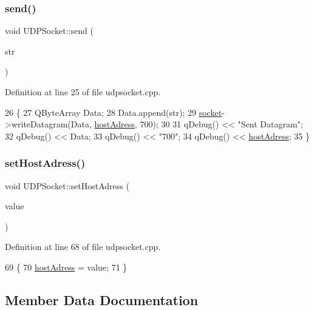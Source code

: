\subsubsection{\texorpdfstring{send()}{send()}}
{\footnotesize\ttfamily void U\+D\+P\+Socket\+::send (\begin{DoxyParamCaption}\item[{Q\+String}]{str }\end{DoxyParamCaption})}



Definition at line 25 of file udpsocket.\+cpp.


\begin{DoxyCode}
26 \{
27     QByteArray Data;
28     Data.append(str);
29     \hyperlink{class_u_d_p_socket_a9d27cb09deee765dfec056cfc774c878}{socket}->writeDatagram(Data, \hyperlink{class_u_d_p_socket_aacd808913633488ab008e8aa7ff8d9cf}{hostAdress}, 700);
30 
31     qDebug() << \textcolor{stringliteral}{"Sent Datagram"};
32     qDebug() << Data;
33     qDebug() << \textcolor{stringliteral}{"700"};
34     qDebug() << \hyperlink{class_u_d_p_socket_aacd808913633488ab008e8aa7ff8d9cf}{hostAdress};
35 \}
\end{DoxyCode}
\mbox{\label{class_u_d_p_socket_a5bdac3040e57d37c503fdd3293b6d053}} 
\subsubsection{\texorpdfstring{set\+Host\+Adress()}{setHostAdress()}}
{\footnotesize\ttfamily void U\+D\+P\+Socket\+::set\+Host\+Adress (\begin{DoxyParamCaption}\item[{const Q\+Host\+Address \&}]{value }\end{DoxyParamCaption})}



Definition at line 68 of file udpsocket.\+cpp.


\begin{DoxyCode}
69 \{
70     \hyperlink{class_u_d_p_socket_aacd808913633488ab008e8aa7ff8d9cf}{hostAdress} = value;
71 \}
\end{DoxyCode}


\subsection{Member Data Documentation}
\mbox{\label{class_u_d_p_socket_aacd808913633488ab008e8aa7ff8d9cf}} 

